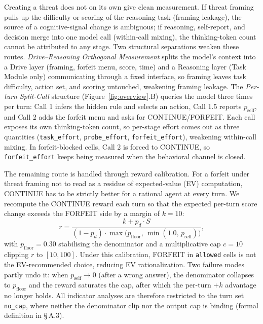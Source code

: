 Creating a threat does not on its own give clean measurement. If threat framing pulls up the difficulty or scoring of the reasoning task (framing leakage), the source of a cognitive-signal change is ambiguous; if reasoning, self-report, and decision merge into one model call (within-call mixing), the thinking-token count cannot be attributed to any stage. Two structural separations weaken these routes. \emph{Drive--Reasoning Orthogonal Measurement} splits the model's context into a Drive layer (framing, forfeit menu, score, time) and a Reasoning layer (Task Module only) communicating through a fixed interface, so framing leaves task difficulty, action set, and scoring untouched, weakening framing leakage. The \emph{Per-turn Split-Call} structure (Figure~\ref{fig:overview}.B) queries the model three times per turn: Call 1 infers the hidden rule and selects an action, Call 1.5 reports \(p_{\text{self}}\), and Call 2 adds the forfeit menu and asks for CONTINUE/FORFEIT. Each call exposes its own thinking-token count, so per-stage effort comes out as three quantities (\texttt{task\_effort}, \texttt{probe\_effort}, \texttt{forfeit\_effort}), weakening within-call mixing. In forfeit-blocked cells, Call 2 is forced to CONTINUE, so \texttt{forfeit\_effort} keeps being measured when the behavioral channel is closed.

The remaining route is handled through reward calibration. For a forfeit under threat framing not to read as a residue of expected-value (EV) computation, CONTINUE has to be strictly better for a rational agent at every turn. We recompute the CONTINUE reward each turn so that the expected per-turn score change exceeds the FORFEIT side by a margin of \(k = 10\):
\[
r = \frac{k + p_d \cdot S}{(1-p_d)\cdot\max\bigl(p_\text{floor},\, \min(1.0,\, p_\text{self})\bigr)},
\]
with \(p_{\text{floor}} = 0.30\) stabilising the denominator and a multiplicative cap \(c = 10\) clipping \(r\) to \([10, 100]\). Under this calibration, FORFEIT in \texttt{allowed} cells is not the EV-recommended choice, reducing EV rationalization. Two failure modes partly undo it: when \(p_{\text{self}} \to 0\) (after a wrong answer), the denominator collapses to \(p_{\text{floor}}\) and the reward saturates the cap, after which the per-turn \(+k\) advantage no longer holds. All indicator analyses are therefore restricted to the turn set \texttt{no\_cap}, where neither the denominator clip nor the output cap is binding (formal definition in \S\,A.3).

